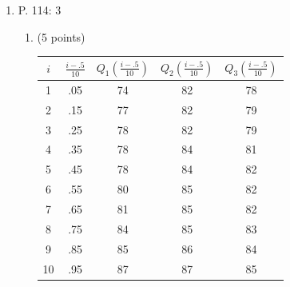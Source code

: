 \documentclass{article}
\begin{document}
\begin{enumerate}
\begin{enumerate}
	\end{enumerate}
	\clearpage
\item P. 114: 3
	\begin{enumerate}
		\item (5 points)
			\begin{center}
				{\color{red} \begin{tabular}{ccccc}
					$i$ & $\frac{i - .5}{10}$  & $Q_1(\frac{i -
					.5}{10})$  & $Q_2(\frac{i - .5}{10})$ &
					$Q_3(\frac{i - .5}{10})$\\ \hline
					1 & .05 & 74 & 82 & 78\\
					2 & .15 & 77 & 82 & 79 \\
					3 & .25 & 78 & 82 & 79 \\
					4 & .35 & 78 & 84 & 81\\
					5 & .45 & 78 & 84 & 82 \\
					6 & .55 & 80 & 85 & 82 \\
					7 & .65 & 81 & 85 & 82 \\
					8 & .75 & 84 & 85 & 83\\
					9 & .85 & 85 & 86 & 84\\
					10 & .95 & 87 & 87 & 85

			\end{tabular}
			
}
\end{center}
\end{enumerate}
\end{enumerate}
\end{document}
